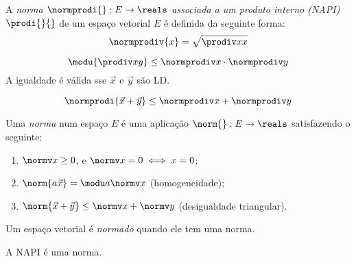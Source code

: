 \begin{definition}
	A \emph{norma $\normprodi{} : E \to \reals$ associada a um produto interno (NAPI)}
	$\prodi{}{}$
	 de um espaço vetorial $E$ é definida da seguinte forma:
	\[\normprodiv{x} = \sqrt{\prodiv xx}\]
\end{definition}

\begin{theorem}
	\[\modu{\prodiv xy} \le \normprodiv x \cdot \normprodiv y \]
	A igualdade é válida sse $\vec x$ e $\vec y$ são LD.
\end{theorem}

\begin{fact}
	\[\normprodi{\vec x + \vec y} \le \normprodiv x + \normprodiv y \]
\end{fact}

\begin{definition}
	Uma \emph{norma} num espaço $E$ é uma aplicação $\norm{} : E \to \reals$
	satisfazendo o seguinte:
	\begin{enumerate}
		\item $\normv x \ge 0$, e $\normv x = 0 \iff x = 0$;
		\item $\norm{a\vec x} = \modu a \normv x$ (homogeneidade);
		\item $\norm{\vec x + \vec y} \le \normv x + \normv y$ (desigualdade triangular).
	\end{enumerate}
	Um espaço vetorial é \emph{normado} quando ele tem uma norma.
\end{definition}

\begin{fact}
	A NAPI é uma norma.
\end{fact}
